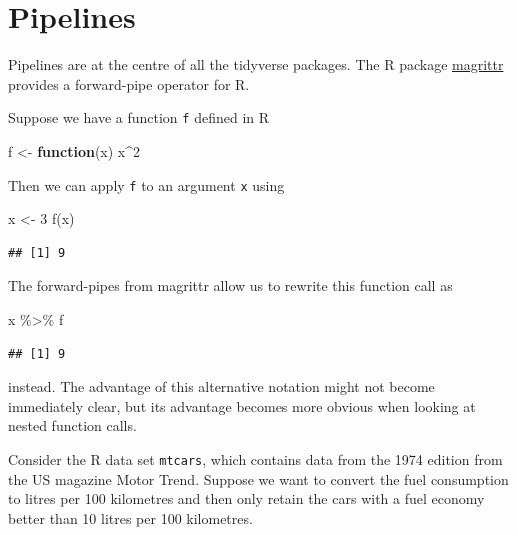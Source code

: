 \documentclass[
]{book}
\newenvironment{Shaded}{\begin{snugshade}}{\end{snugshade}}
\newcommand{\ControlFlowTok}[1]{\textcolor[rgb]{0.13,0.29,0.53}{\textbf{#1}}}
\newcommand{\DecValTok}[1]{\textcolor[rgb]{0.00,0.00,0.81}{#1}}
\newcommand{\FunctionTok}[1]{\textcolor[rgb]{0.00,0.00,0.00}{#1}}
\newcommand{\NormalTok}[1]{#1}
\newcommand{\OtherTok}[1]{\textcolor[rgb]{0.56,0.35,0.01}{#1}}
\newcommand{\SpecialCharTok}[1]{\textcolor[rgb]{0.00,0.00,0.00}{#1}}
\begin{document}
\hypertarget{pipelines}{%
\section{Pipelines}\label{pipelines}}

Pipelines are at the centre of all the tidyverse packages. The R package \href{https://cran.r-project.org/web/packages/magrittr/}{magrittr} provides a forward-pipe operator for R.

Suppose we have a function \texttt{f} defined in R

\begin{Shaded}
\begin{Highlighting}[]
\NormalTok{f }\OtherTok{\textless{}{-}} \ControlFlowTok{function}\NormalTok{(x)}
\NormalTok{  x}\SpecialCharTok{\^{}}\DecValTok{2}
\end{Highlighting}
\end{Shaded}

Then we can apply \texttt{f} to an argument \texttt{x} using

\begin{Shaded}
\begin{Highlighting}[]
\NormalTok{x }\OtherTok{\textless{}{-}} \DecValTok{3}
\FunctionTok{f}\NormalTok{(x)}
\end{Highlighting}
\end{Shaded}

\begin{verbatim}
## [1] 9
\end{verbatim}

The forward-pipes from magrittr allow us to rewrite this function call as

\begin{Shaded}
\begin{Highlighting}[]
\NormalTok{x }\SpecialCharTok{\%\textgreater{}\%}\NormalTok{ f}
\end{Highlighting}
\end{Shaded}

\begin{verbatim}
## [1] 9
\end{verbatim}

instead. The advantage of this alternative notation might not become immediately clear, but its advantage becomes more obvious when looking at nested function calls.

Consider the R data set \texttt{mtcars}, which contains data from the 1974 edition from the US magazine Motor Trend. Suppose we want to convert the fuel consumption to litres per 100 kilometres and then only retain the cars with a fuel economy better than 10 litres per 100 kilometres.
\end{document}
